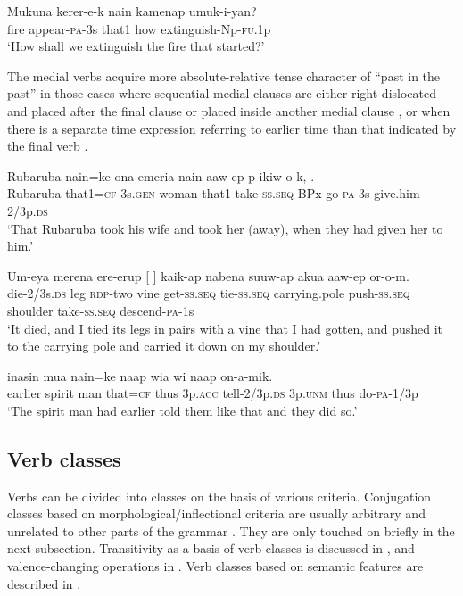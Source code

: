 \ea%
\label{ex:3:x1030}
\gll Mukuna kerer-e-k nain kamenap umuk-i-yan? \\
fire appear-\textsc{pa}-3s that1 how extinguish-Np-\textsc{fu}.1p\\
\glt`How shall we extinguish the fire that started?'
\z

The medial verbs acquire more absolute-relative tense character of ``past in the past'' \citep[65]{Comrie1985} in those cases where sequential medial clauses are either right-dislocated and placed after the final clause  or placed inside another medial clause , or when there is a separate time expression referring to earlier time than that indicated by the final verb . 

\ea%
\label{ex:3:x1031}
\gll Rubaruba nain=ke ona emeria nain aaw-ep p-ikiw-o-k, .\\
Rubaruba that1=\textsc{cf} 3s.\textsc{gen} woman that1 take-\textsc{ss}.\textsc{seq} BPx-go-\textsc{pa}-3s give.him-2/3p.\textsc{ds}\\
\glt`That Rubaruba took his wife and took her (away), when they had given her to him.'
\z

\ea%
\label{ex:3:x1032}
\gll Um-eya merena ere-erup [ ] kaik-ap nabena suuw-ap akua aaw-ep or-o-m.\\
die-2/3s.\textsc{ds} leg \textsc{rdp}-two vine get-\textsc{ss}.\textsc{seq} tie-\textsc{ss}.\textsc{seq} carrying.pole push-\textsc{ss}.\textsc{seq} shoulder take-\textsc{ss}.\textsc{seq} descend-\textsc{pa}-1s\\
\glt `It died, and I tied its legs in pairs with a vine that I had gotten, and pushed it to the carrying pole and carried it down on my shoulder.'
\z

\ea%
\label{ex:3:x1033}
\gll {} inasin mua nain=ke naap wia  wi naap on-a-mik.\\
earlier spirit man that=\textsc{cf} thus 3p.\textsc{acc} tell-2/3p.\textsc{ds} 3p.\textsc{unm} thus do-\textsc{pa}-1/3p\\
\glt `The spirit man had earlier told them like that and they did so.'
\z

\subsection{Verb classes} \label{sec:3.8.4}
{}
Verbs can be divided into classes on the basis of various criteria. Conjugation classes based on morphological/inflectional criteria are usually arbitrary and unrelated to other parts of the grammar \citep[191]{Anderson1985b}. They are only touched on briefly in the next subsection. Transitivity as a basis of verb classes is discussed in , and valence-changing operations in . Verb classes based on semantic features are described in .

